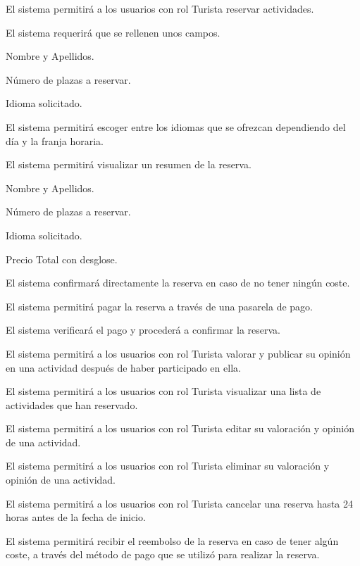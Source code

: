 \begin{enumitem}[label=\bfseries{RTur \arabic*.},leftmargin=*]
	\item El sistema permitirá a los usuarios con rol Turista reservar actividades.
	\begin{enumitem}[label*=\bfseries{\arabic*.}]
		\item El sistema requerirá que se rellenen unos campos.
		\begin{enumitem}[label*=\bfseries{\arabic*.}]
			\item Nombre y Apellidos.
			\item Número de plazas a reservar.
			\item Idioma solicitado.
			\begin{enumitem}[label*=\bfseries{\arabic*.}]
				\item El sistema permitirá escoger entre los idiomas que se ofrezcan dependiendo del día y la franja horaria.
			\end{enumitem}
		\end{enumitem}
		\item El sistema permitirá visualizar un resumen de la reserva.
		\begin{enumitem}[label*=\bfseries{\arabic*.}]
			\item Nombre y Apellidos.
			\item Número de plazas a reservar.
			\item Idioma solicitado.
			\item Precio Total con desglose.
		\end{enumitem}
		\item El sistema confirmará directamente la reserva en caso de no tener ningún coste.
		\item El sistema permitirá pagar la reserva a través de una pasarela de pago.
		\item El sistema verificará el pago y procederá a confirmar la reserva.
	\end{enumitem}

	\item El sistema permitirá a los usuarios con rol Turista valorar y publicar su opinión en una actividad después de haber participado en ella.
	\item El sistema permitirá a los usuarios con rol Turista visualizar una lista de actividades que han reservado.
	\item El sistema permitirá a los usuarios con rol Turista editar su valoración y opinión de una actividad.
	\item El sistema permitirá a los usuarios con rol Turista eliminar su valoración y opinión de una actividad.
	\item El sistema permitirá a los usuarios con rol Turista cancelar una reserva hasta 24 horas antes de la fecha de inicio.
	\begin{enumitem}[label*=\bfseries{\arabic*.}]
		\item El sistema permitirá recibir el reembolso de la reserva en caso de tener algún coste, a través del método de pago que se utilizó para realizar la reserva.
	\end{enumitem}
\end{enumitem}

